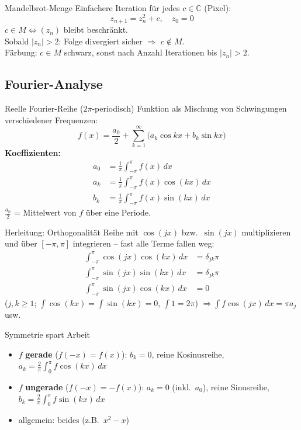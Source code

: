 \documentclass[a4paper, fontsize=7pt]{scrartcl}
\def\sumk{\sum_{k=1}^\infty}
\def\C{\mathbb{C}}  %
\def\dx{\,dx}
\begin{document}
\begin{mainbox}{Mandelbrot-Menge}
Einfachere Iteration für jedes $c \in \C$ (Pixel):
$$\boxed{z_{n+1} = z_n^2 + c, \quad z_0 = 0}$$
$c \in M \iff (z_n)$ bleibt beschränkt.\\
Sobald $|z_n| > 2$: Folge divergiert sicher $\Rightarrow$ $c \notin M$.\\
Färbung: $c \in M$ schwarz, sonst nach Anzahl Iterationen bis
$|z_n| > 2$.
\end{mainbox}

\subsection{Fourier-Analyse}

\begin{mainbox}{Reelle Fourier-Reihe ($2\pi$-periodisch)}
Funktion als Mischung von Schwingungen verschiedener Frequenzen:
$$\boxed{f(x) = \frac{a_0}{2} + \sumk \big(a_k\cos kx + b_k\sin kx\big)}$$
\textbf{Koeffizienten:}
\begin{align*}
a_0 &= \frac{1}{\pi}\int_{-\pi}^{\pi} f(x)\dx\\
a_k &= \frac{1}{\pi}\int_{-\pi}^{\pi} f(x)\cos(kx)\dx\\
b_k &= \frac{1}{\pi}\int_{-\pi}^{\pi} f(x)\sin(kx)\dx
\end{align*}
$\frac{a_0}{2}$ = Mittelwert von $f$ über eine Periode.
\end{mainbox}

\begin{subbox}{Herleitung: Orthogonalität}
Reihe mit $\cos(jx)$ bzw.\ $\sin(jx)$ multiplizieren und über
$[-\pi, \pi]$ integrieren -- fast alle Terme fallen weg:
\begin{align*}
\int_{-\pi}^{\pi} \cos(jx)\cos(kx)\dx &= \delta_{jk}\pi\\
\int_{-\pi}^{\pi} \sin(jx)\sin(kx)\dx &= \delta_{jk}\pi\\
\int_{-\pi}^{\pi} \sin(jx)\cos(kx)\dx &= 0
\end{align*}
($j, k \ge 1$; $\int \cos(kx) = \int \sin(kx) = 0$, $\int 1 = 2\pi$)
$\Rightarrow \int f\cos(jx)\dx = \pi a_j$ usw.
\end{subbox}

\begin{mainbox}{Symmetrie spart Arbeit}
\begin{itemize}
    \item $f$ \textbf{gerade} ($f(-x) = f(x)$): $b_k = 0$, reine
          Kosinusreihe, $a_k = \frac{2}{\pi}\int_0^\pi f\cos(kx)\dx$
    \item $f$ \textbf{ungerade} ($f(-x) = -f(x)$): $a_k = 0$ (inkl.\
          $a_0$), reine Sinusreihe, $b_k = \frac{2}{\pi}\int_0^\pi
          f\sin(kx)\dx$
    \item allgemein: beides (z.B.\ $x^2 - x$)
\end{itemize}
\end{mainbox}
\end{document}
